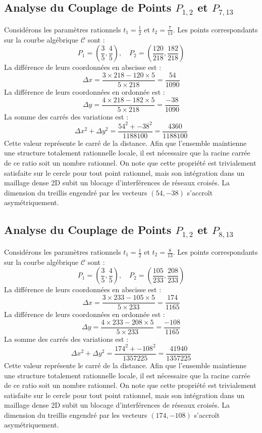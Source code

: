 \documentclass[12pt, a4paper]{article}
\begin{document}
\subsection{Analyse du Couplage de Points $P_{1,2}$ et $P_{7,13}$}
Considérons les paramètres rationnels $t_1 = \frac{1}{2}$ et $t_2 = \frac{7}{13}$.
Les points correspondants sur la courbe algébrique $\mathcal{C}$ sont :
$$ P_1 = \left( \frac{3}{5}, \frac{4}{5} \right), \quad P_2 = \left( \frac{120}{218}, \frac{182}{218} \right) $$
La différence de leurs coordonnées en abscisse est :
$$ \Delta x = \frac{3 \times 218 - 120 \times 5}{5 \times 218} = \frac{54}{1090} $$
La différence de leurs coordonnées en ordonnée est :
$$ \Delta y = \frac{4 \times 218 - 182 \times 5}{5 \times 218} = \frac{-38}{1090} $$
La somme des carrés des variations est :
$$ \Delta x^2 + \Delta y^2 = \frac{ 54^2 + -38^2 }{ 1188100 } = \frac{ 4360 }{ 1188100 } $$
Cette valeur représente le carré de la distance. Afin que l'ensemble maintienne une structure totalement rationnelle locale, il est nécessaire que la racine carrée de ce ratio soit un nombre rationnel. On note que cette propriété est trivialement satisfaite sur le cercle pour tout point rationnel, mais son intégration dans un maillage dense 2D subit un blocage d'interférences de réseaux croisés. La dimension du treillis engendré par les vecteurs $( 54, -38 )$ s'accroît asymétriquement.


\subsection{Analyse du Couplage de Points $P_{1,2}$ et $P_{8,13}$}
Considérons les paramètres rationnels $t_1 = \frac{1}{2}$ et $t_2 = \frac{8}{13}$.
Les points correspondants sur la courbe algébrique $\mathcal{C}$ sont :
$$ P_1 = \left( \frac{3}{5}, \frac{4}{5} \right), \quad P_2 = \left( \frac{105}{233}, \frac{208}{233} \right) $$
La différence de leurs coordonnées en abscisse est :
$$ \Delta x = \frac{3 \times 233 - 105 \times 5}{5 \times 233} = \frac{174}{1165} $$
La différence de leurs coordonnées en ordonnée est :
$$ \Delta y = \frac{4 \times 233 - 208 \times 5}{5 \times 233} = \frac{-108}{1165} $$
La somme des carrés des variations est :
$$ \Delta x^2 + \Delta y^2 = \frac{ 174^2 + -108^2 }{ 1357225 } = \frac{ 41940 }{ 1357225 } $$
Cette valeur représente le carré de la distance. Afin que l'ensemble maintienne une structure totalement rationnelle locale, il est nécessaire que la racine carrée de ce ratio soit un nombre rationnel. On note que cette propriété est trivialement satisfaite sur le cercle pour tout point rationnel, mais son intégration dans un maillage dense 2D subit un blocage d'interférences de réseaux croisés. La dimension du treillis engendré par les vecteurs $( 174, -108 )$ s'accroît asymétriquement.
\end{document}
